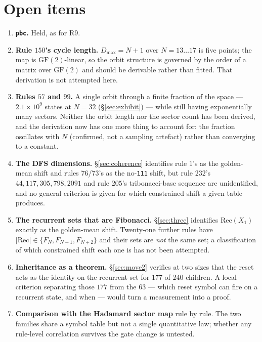 \documentclass[11pt]{article}
\newcommand{\rt}[1]{\texttt{#1}}
\theoremstyle{plain}
\theoremstyle{definition}
\begin{document}
\section{Open items}

\begin{enumerate}
\item \textbf{\rt{pbc}.} Held, as for R9.
\item \textbf{Rule $150$'s cycle length.} $D_{\max}=N+1$ over $N=13\ldots17$ is
  five points; the map is $\mathrm{GF}(2)$-linear, so the orbit structure is
  governed by the order of a matrix over $\mathrm{GF}(2)$ and should be derivable
  rather than fitted. That derivation is not attempted here.
\item \textbf{Rules $57$ and $99$.} A single orbit through a finite fraction of
  the space --- $2.1\times10^9$ states at $N=32$ (\S\ref{sec:exhibit}) --- while
  still having exponentially many sectors. Neither the orbit length nor the
  sector count has been derived, and the derivation now has one more thing to
  account for: the fraction oscillates with $N$ (confirmed, not a sampling
  artefact) rather than converging to a constant.
\item \textbf{The DFS dimensions.} \S\ref{sec:coherence} identifies rule $1$'s
  as the golden-mean shift and rules $76$/$73$'s as the no-\rt{111} shift, but
  rule $232$'s $44,117,305,798,2091$ and rule $205$'s tribonacci-base sequence are
  unidentified, and no general criterion is given for which constrained shift a
  given table produces.
\item \textbf{The recurrent sets that are Fibonacci.} \S\ref{sec:three}
  identifies $\mathrm{Rec}(X_1)$ exactly as the golden-mean shift. Twenty-one
  further rules have $|\mathrm{Rec}|\in\{F_N,F_{N+1},F_{N+2}\}$ and their sets
  are \emph{not} the same set; a classification of which constrained shift each
  one is has not been attempted.
\item \textbf{Inheritance as a theorem.} \S\ref{sec:move2} verifies at two
  sizes that the reset acts as the identity on the recurrent set for $177$ of
  $240$ children. A local criterion separating those $177$ from the $63$ --- which
  reset symbol can fire on a recurrent state, and when --- would turn a
  measurement into a proof.
\item \textbf{Comparison with the Hadamard sector map} rule by rule. The two
  families share a symbol table but not a single quantitative law; whether any
  rule-level correlation survives the gate change is untested.
\end{enumerate}
\end{document}
